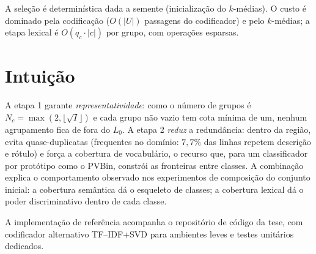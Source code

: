 A seleção é determinística dada a semente (inicialização do $k$-médias). O
custo é dominado pela codificação ($O(|U|)$ passagens do codificador) e pelo
$k$-médias; a etapa lexical é $O(q_c \cdot |c|)$ por grupo, com operações
esparsas.

\section{Intuição}

A etapa 1 garante \emph{representatividade}: como o número de grupos é
$N_c = \max(2, \lfloor\sqrt{I}\rfloor)$ e cada grupo não vazio tem cota mínima
de um, nenhum agrupamento fica de fora do $L_0$. A etapa 2 \emph{reduz} a
redundância: dentro da região, evita quase-duplicatas (frequentes no domínio:
$7{,}7\%$ das linhas repetem descrição e rótulo) e força a cobertura de
vocabulário, o recurso que, para um classificador por protótipo como o
PVBin, constrói as fronteiras entre classes. A combinação explica o
comportamento observado nos experimentos de composição do conjunto inicial:
a cobertura semântica dá o esqueleto de classes; a cobertura lexical dá o
poder discriminativo dentro de cada classe.

A implementação de referência acompanha o repositório de código da tese, com
codificador alternativo TF--IDF+SVD para ambientes leves e testes unitários
dedicados.
